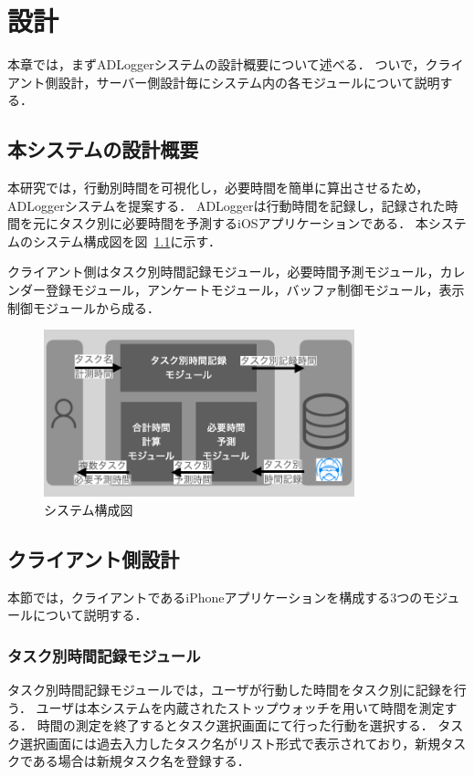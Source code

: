 \chapter{設計}
本章では，まずADLoggerシステムの設計概要について述べる．
ついで，クライアント側設計，サーバー側設計毎にシステム内の各モジュールについて説明する．

\section{本システムの設計概要}
本研究では，行動別時間を可視化し，必要時間を簡単に算出させるため，ADLoggerシステムを提案する．
ADLoggerは行動時間を記録し，記録された時間を元にタスク別に必要時間を予測するiOSアプリケーションである．
本システムのシステム構成図を図~\ref{fig:system}に示す．

クライアント側はタスク別時間記録モジュール，必要時間予測モジュール，カレンダー登録モジュール，アンケートモジュール，バッファ制御モジュール，表示制御モジュールから成る．

\begin{figure}[tb]
	\begin{center}
	\includegraphics[width=9cm]{images/5/3.png}
	\end{center}
	\caption{システム構成図}
	\label{fig:system}
\end{figure}

\section{クライアント側設計}
本節では，クライアントであるiPhoneアプリケーションを構成する3つのモジュールについて説明する．

\subsection{タスク別時間記録モジュール}
タスク別時間記録モジュールでは，ユーザが行動した時間をタスク別に記録を行う．
ユーザは本システムを内蔵されたストップウォッチを用いて時間を測定する．
時間の測定を終了するとタスク選択画面にて行った行動を選択する．
タスク選択画面には過去入力したタスク名がリスト形式で表示されており，新規タスクである場合は新規タスク名を登録する．

